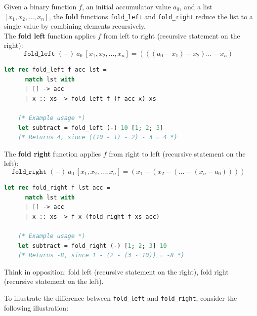 \newpage 

\noindent
\begin{Def}

    Given a binary function \( f \), an initial accumulator value \( a_0 \), and a list \([x_1, x_2, \dots, x_n]\), the \textbf{fold} functions \texttt{fold\_left} and \texttt{fold\_right} reduce the list to a single value by combining elements recursively.\\

    \noindent
    The \textbf{fold left} function applies \( f \) from left to right (recursive statement on the right):
    \[
    \texttt{fold\_left } (-) \ a_0\ [x_1, x_2, \dots, x_n] = (((a_0 - x_1) - x_2) \dots - x_n)
    \]
    \begin{lstlisting}[language=OCaml, caption={Ocaml Implementation of Fold\_Left}, numbers=none]
    let rec fold_left f acc lst =
      match lst with
      | [] -> acc
      | x :: xs -> fold_left f (f acc x) xs

    (* Example usage *)
    let subtract = fold_left (-) 10 [1; 2; 3]  
    (* Returns 4, since ((10 - 1) - 2) - 3 = 4 *)
    \end{lstlisting}

    \vspace{1em}
    \noindent
    The \textbf{fold right} function applies \( f \) from right to left (recursive statement on the left):
    \[
    \texttt{fold\_right } (-) \ a_0\ [x_1, x_2, \dots, x_n] = (x_1 - (x_2 - (\dots - (x_n - a_0))))
    \]

    \noindent
    \begin{lstlisting}[language=OCaml, caption={Ocaml Implementation of Fold\_Right}, numbers=none]
    let rec fold_right f lst acc =
      match lst with
      | [] -> acc
      | x :: xs -> f x (fold_right f xs acc)

    (* Example usage *)
    let subtract = fold_right (-) [1; 2; 3] 10  
    (* Returns -8, since 1 - (2 - (3 - 10)) = -8 *)
    \end{lstlisting}
\end{Def}

\begin{Tip}
    Think in opposition: fold left (recursive statement on the right), fold right (recursive statement on the left).
\end{Tip}

\newpage 

\noindent
To illustrate the difference between \texttt{fold\_left} and \texttt{fold\_right}, consider the following illustration:

